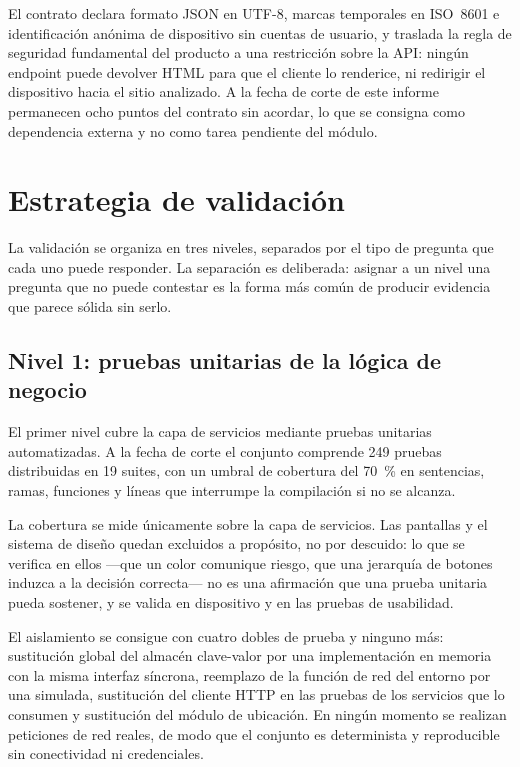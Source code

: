El contrato declara formato JSON en UTF-8, marcas temporales en ISO~8601 e
identificación anónima de dispositivo sin cuentas de usuario, y traslada la regla de
seguridad fundamental del producto a una restricción sobre la API: ningún endpoint
puede devolver HTML para que el cliente lo renderice, ni redirigir el dispositivo
hacia el sitio analizado. A la fecha de corte de este informe permanecen ocho puntos
del contrato sin acordar, lo que se consigna como dependencia externa y no como tarea
pendiente del módulo.

\section{Estrategia de validación}

La validación se organiza en tres niveles, separados por el tipo de pregunta que cada
uno puede responder. La separación es deliberada: asignar a un nivel una pregunta que
no puede contestar es la forma más común de producir evidencia que parece sólida sin
serlo.

\subsection{Nivel 1: pruebas unitarias de la lógica de negocio}

El primer nivel cubre la capa de servicios mediante pruebas unitarias automatizadas.
A la fecha de corte el conjunto comprende 249 pruebas distribuidas en 19 suites, con
un umbral de cobertura del 70~\% en sentencias, ramas, funciones y líneas que
interrumpe la compilación si no se alcanza.

La cobertura se mide únicamente sobre la capa de servicios. Las pantallas y el sistema
de diseño quedan excluidos a propósito, no por descuido: lo que se verifica en ellos
---que un color comunique riesgo, que una jerarquía de botones induzca a la decisión
correcta--- no es una afirmación que una prueba unitaria pueda sostener, y se valida en
dispositivo y en las pruebas de usabilidad.

El aislamiento se consigue con cuatro dobles de prueba y ninguno más: sustitución
global del almacén clave-valor por una implementación en memoria con la misma
interfaz síncrona, reemplazo de la función de red del entorno por una simulada,
sustitución del cliente HTTP en las pruebas de los servicios que lo consumen y
sustitución del módulo de ubicación. En ningún momento se realizan peticiones de red
reales, de modo que el conjunto es determinista y reproducible sin conectividad ni
credenciales.

